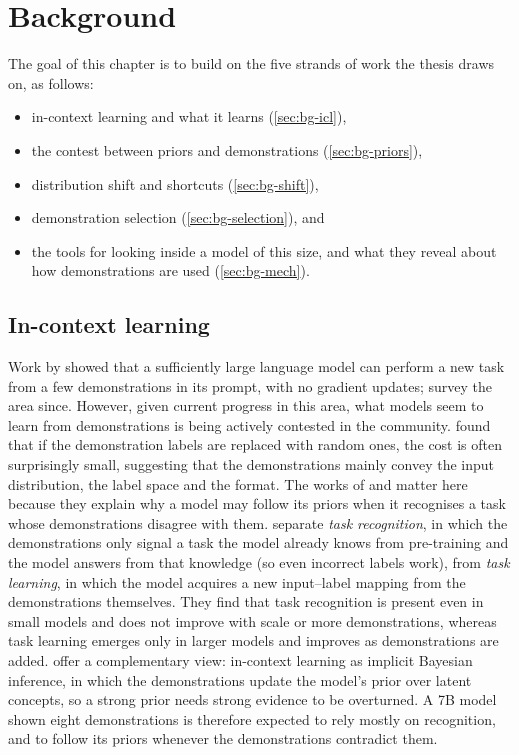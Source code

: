 \chapter{Background}
The goal of this chapter is to build on the five strands of work the thesis draws on, as follows:

\begin{itemize}
    \item in-context learning and what it learns (\autoref{sec:bg-icl}),
    \item the contest between priors and demonstrations (\autoref{sec:bg-priors}),
    \item distribution shift and shortcuts (\autoref{sec:bg-shift}),
    \item demonstration selection (\autoref{sec:bg-selection}), and
    \item the tools for looking inside a model of this size, and what they reveal about how demonstrations are used (\autoref{sec:bg-mech}).
\end{itemize}

\section{In-context learning}
\label{sec:bg-icl}
Work by \citet{brown2020language} showed that a sufficiently large language model can perform a new task from a few demonstrations in its prompt, with no gradient updates; \citet{dong2024survey} survey the area since. However, given current progress in this area, what models seem to learn from demonstrations is being actively contested in the community. \citet{min2022rethinking} found that if the demonstration labels are replaced with random ones, the cost is often surprisingly small, suggesting that the demonstrations mainly convey the input distribution, the label space and the format. The works of \citet{pan2023what} and \citet{xie2022explanation} matter here because they
explain why a model may follow its priors when it recognises a task whose demonstrations disagree with them. \citet{pan2023what} separate \emph{task recognition}, in which the demonstrations only signal a task the model already knows from pre-training and the model answers from that knowledge (so even incorrect labels work), from \emph{task learning}, in which the model acquires a new input--label mapping from the demonstrations themselves.
They find that task recognition is present even in small models and does not improve with scale or more demonstrations, whereas task learning emerges only in larger models and improves as demonstrations are added. \citet{xie2022explanation} offer a complementary view: in-context learning as implicit Bayesian inference, in which the demonstrations update the model's prior over latent concepts, so a strong prior needs strong evidence to be overturned. A 7B model shown eight demonstrations is therefore expected to rely mostly on recognition, and to follow its priors whenever the demonstrations contradict them.

